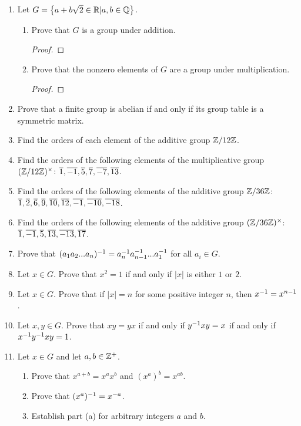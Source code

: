 \begin{enumerate}
\begin{enumerate}
		\end{enumerate}
		\item Let $G = \left\{ a+b\sqrt{2}\in\mathbb{R}|a,b\in\mathbb{Q} \right\}$.
		\begin{enumerate}
			\item Prove that $G$ is a group under addition.
			\begin{proof}
			\end{proof}
			\item Prove that the nonzero elements of $G$ are a group under multiplication.
			\begin{proof}
			\end{proof}
		\end{enumerate}
		\item Prove that a finite group is abelian if and only if its group table is a symmetric matrix.
		\item Find the orders of each element of the additive group $\mathbb{Z}/12\mathbb{Z}$.
		\item Find the orders of the following elements of the multiplicative group $(\mathbb{Z}/12\mathbb{Z})^\times$: $\overline{1},\overline{-1},\overline{5},\overline{7},\overline{-7},\overline{13}$.
		\item Find the orders of the following elements of the additive group $\mathbb{Z}/36\mathbb{Z}$: $\overline{1},\overline{2},\overline{6},\overline{9},\overline{10},\overline{12},\overline{-1},\overline{-10},\overline{-18}$.
		\item Find the orders of the following elements of the additive group $(\mathbb{Z}/36\mathbb{Z})^\times$: $\overline{1},\overline{-1},\overline{5},\overline{13},\overline{-13},\overline{17}$.
		\item Prove that $(a_1a_2...a_n)^{-1} = a_n^{-1} a_{n-1}^{-1} ... a_1^{-1}$ for all $a_i\in G$.
		\item Let $x\in G$.  Prove that $x^2=1$ if and only if $|x|$ is either $1$ or $2$.
		\item Let $x\in G$.  Prove that if $|x| = n$ for some positive integer $n$, then $x^{-1} = x^{n-1}$.
		\item Let $x,y\in G$.  Prove that $xy = yx$ if and only if $y^{-1} x y = x$ if and only if $x^{-1} y^{-1} xy = 1$.
		\item Let $x\in G$ and let $a,b \in\mathbb{Z}^+$.
		\begin{enumerate}
			\item Prove that $x^{a+b} = x^ax^b$ and $(x^a)^b = x^{ab}$.
			\item Prove that $(x^a)^{-1} = x^{-a}$.
			\item Establish part (a) for arbitrary integers $a$ and $b$.
		\end{enumerate}

\end{enumerate}
